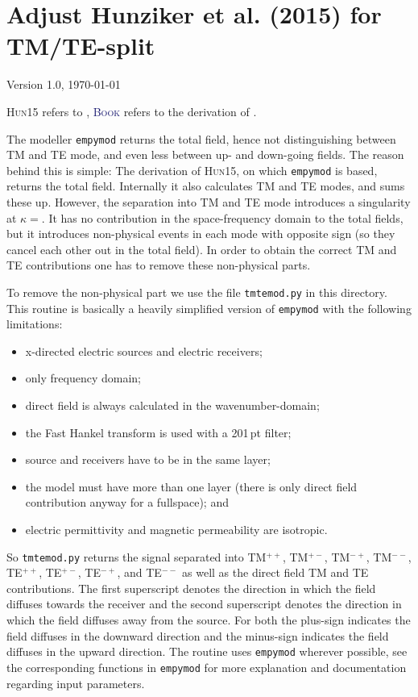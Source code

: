 \documentclass[fontsize=9pt, parskip=half, notitlepage, fleqn]{scrartcl}
\newcommand{\bkcol}[1]{\textcolor{MidnightBlue}{#1\xspace}}
\newcommand{\hun}{\textsc{Hun15}\xspace}
\newcommand{\book}{\bkcol{\textsc{Book}}\xspace}
\newcommand{\empymod}{\texttt{empymod}\xspace}
\newcommand{\tmtemod}{\texttt{tmtemod.py}\xspace}
\begin{document}
\setlength{\jot}{10pt}  %

\section*{Adjust Hunziker et al. (2015) for TM/TE-split}

{\ttfamily \small Version 1.0, \today

\hun refers to \cite{GEO.15.Hunziker}, \book refers to the derivation of
\cite{CUP.17.Ziolkowski}.}

The modeller \empymod returns the total field, hence not distinguishing between
TM and TE mode, and even less between up- and down-going fields. The reason
behind this is simple: The derivation of \hun, on which \empymod is based,
returns the total field. Internally it also calculates TM and TE modes, and
sums these up. However, the separation into TM and TE mode introduces a
singularity at $\kappa = $. It has no contribution in the space-frequency
domain to the total fields, but it introduces non-physical events in each mode
with opposite sign (so they cancel each other out in the total field). In
order to obtain the correct TM and TE contributions one has to remove these
non-physical parts.

To remove the non-physical part we use the file \tmtemod in this
directory. This routine is basically a heavily simplified version of \empymod
with the following limitations:
\begin{itemize}
  \item x-directed electric sources and electric receivers;
  \item only frequency domain;
  \item direct field is always calculated in the wavenumber-domain;
  \item the Fast Hankel transform is used with a 201\,pt filter;
  \item source and receivers have to be in the same layer;
  \item the model must have more than one layer (there is only direct field
    contribution anyway for a fullspace); and
  \item electric permittivity and magnetic permeability are isotropic.
\end{itemize}

So \tmtemod returns the signal separated into TM$^{++}$, TM$^{+-}$, TM$^{-+}$,
TM$^{--}$, TE$^{++}$, TE$^{+-}$, TE$^{-+}$, and TE$^{--}$ as well as the direct
field TM and TE contributions. The first superscript denotes the direction in
which the field diffuses towards the receiver and the second superscript
denotes the direction in which the field diffuses away from the source. For
both the plus-sign indicates the field diffuses in the downward direction and
the minus-sign indicates the field diffuses in the upward direction. The
routine uses \empymod wherever possible, see the corresponding functions in
\empymod for more explanation and documentation regarding input parameters.
\end{document}
